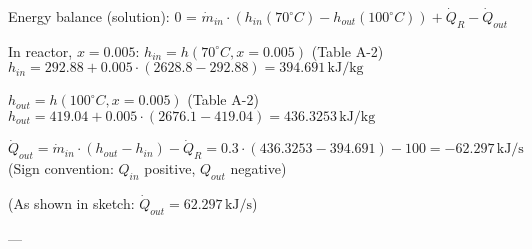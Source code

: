 Energy balance (solution):  
0 = \( \dot{m}_{in} \cdot (h_{in}(70^\circ C) - h_{out}(100^\circ C)) + \dot{Q}_R - \dot{Q}_{out} \)  

In reactor, \( x = 0.005 \):  
\( h_{in} = h(70^\circ C, x = 0.005) \) (Table A-2)  
\( h_{in} = 292.88 + 0.005 \cdot (2628.8 - 292.88) = 394.691 \, \text{kJ/kg} \)  

\( h_{out} = h(100^\circ C, x = 0.005) \) (Table A-2)  
\( h_{out} = 419.04 + 0.005 \cdot (2676.1 - 419.04) = 436.3253 \, \text{kJ/kg} \)  

\( \dot{Q}_{out} = \dot{m}_{in} \cdot (h_{out} - h_{in}) - \dot{Q}_R = 0.3 \cdot (436.3253 - 394.691) - 100 = -62.297 \, \text{kJ/s} \)  
(Sign convention: \( Q_{in} \) positive, \( Q_{out} \) negative)  

(As shown in sketch: \( \dot{Q}_{out} = 62.297 \, \text{kJ/s} \))  

---